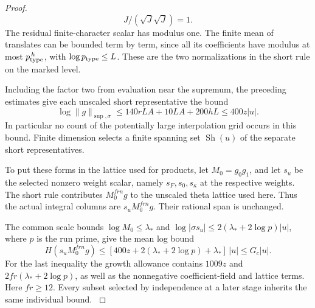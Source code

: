 \begin{proof}
\[
  J/(\sqrt J\sqrt J)=1.
\]
 The residual finite-character scalar
has modulus one. The finite mean of translates can be bounded
term by term, since all its coefficients have modulus at most
\(p_{\rm type}^{\,h}\), with \(\log p_{\rm type}\le L\).
These are the two normalizations in the short rule on the
marked level.
\label{cor:slice-short-heights-4}

Including the factor two from evaluation near the supremum, the
preceding estimates give each unscaled short representative the
bound
\[
 \log\|g\|_{\sup,\sigma}
 \le 140rLA+10LA+200hL\le400z|u|.
\]
In particular no count of the potentially large interpolation
grid occurs in this bound. Finite dimension selects a finite spanning
set \(\operatorname{Sh}(u)\) of the separate short representatives.

To put these forms in the lattice used for products, let
\(M_0=g_0g_1\), and let \(s_u\) be the selected nonzero weight
scalar, namely \(s_F,s_0,s_\kappa\) at the respective weights.
The short rule contributes \(M_0^{frn}g\) to the unscaled
theta lattice used here. Thus the actual integral columns
are \(s_uM_0^{frn}g\). Their rational span is unchanged.

The common scale bounds \(\log M_0\le\lambda_*\) and
\(\log|\sigma s_u|\le2(\lambda_*+2\log p)|u|\), where \(p\)
is the run prime, give the mean log bound
\[
 H(s_uM_0^{frn}g)
 \le [400z+2(\lambda_*+2\log p)+\lambda_*]\,|u|
 \le G_c |u|.
\]
For the last inequality the growth allowance contains \(1009z\)
and \(2fr(\lambda_*+2\log p)\), as well as the nonnegative
coefficient-field and lattice terms. Here \(fr\ge 12\).
Every subset selected by independence at a later stage inherits
the same individual bound.
\label{cor:slice-short-heights-5}
\end{proof}
